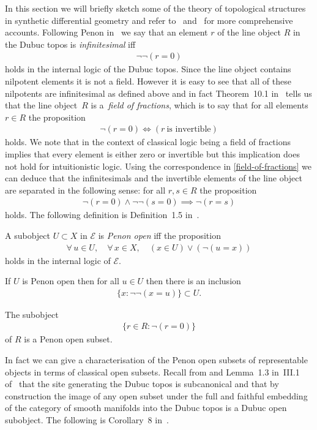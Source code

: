\documentclass[pdftex]{sigma}
\numberwithin{equation}{section}
\begin{document}
In this section we will brief\/ly sketch some of the theory of topological structures in synthetic dif\/ferential geometry and refer to~\cite{1987BungeMartaandDubucEduardoJ131} and~\cite{MR798526} for more comprehensive accounts. Following Penon in~\cite{MR609161} we say that an element $r$ of the line object $R$ in the Dubuc topos is \emph{infinitesimal} if\/f
\begin{gather*}\neg\neg(r=0)\end{gather*}
holds in the internal logic of the Dubuc topos. Since the line object contains nilpotent elements it is not a f\/ield. However it is easy to see that all of these nilpotents are inf\/initesimal as def\/ined above and in fact Theorem~10.1 in~\cite{MR2244115} tells us that the line object~$R$ is a~\emph{field of fractions}, which is to say that for all elements $r\in R$ the proposition
\begin{gather}\label{field-of-fractions}
 \neg(r=0)\iff (r~\text{is invertible})
\end{gather}
holds. We note that in the context of classical logic being a f\/ield of fractions implies that every element is either zero or invertible but this implication does not hold for intuitionistic logic. Using the correspondence in \eqref{field-of-fractions} we can deduce that the inf\/initesimals and the invertible elements of the line object are separated in the following sense: for all $r,s\in R$ the proposition
\begin{gather*}\neg(r=0)\wedge\neg\neg(s=0)\implies \neg(r=s)\end{gather*}
holds. The following def\/inition is Def\/inition~1.5 in~\cite{MR866615}.
\begin{Definition}\label{04/16/1505:00:39 PM}
A subobject $U\subset X$ in $\mathcal{E}$ is \emph{Penon open} if\/f the proposition
\begin{gather*}\forall\, u\in U, \quad \forall\, x\in X, \quad (x\in U)\vee(\neg(u=x))\end{gather*}
holds in the internal logic of $\mathcal{E}$.
\end{Definition}
\begin{Remark}If $U$ is Penon open then for all $u\in U$ then there is an inclusion
\begin{gather*}\{x\colon \neg\neg (x=u)\}\subset U.\end{gather*}
\end{Remark}
\begin{Example}
The subobject
\begin{gather*}\{r\in R\colon \neg(r=0)\}\end{gather*}
of $R$ is a Penon open subset.
\end{Example}In fact we can give a characterisation of the Penon open subsets of representable objects in terms of classical open subsets. Recall from \cite{1981EduardoJDubuc80} and Lemma~1.3 in~III.1 of~\cite{MR1083355} that the site generating the Dubuc topos is subcanonical and that by construction the image of any open subset under the full and faithful embedding of the category of smooth manifolds into the Dubuc topos is a Dubuc open subobject. The following is Corollary~8 in~\cite{MR1055025}.
\end{document}
